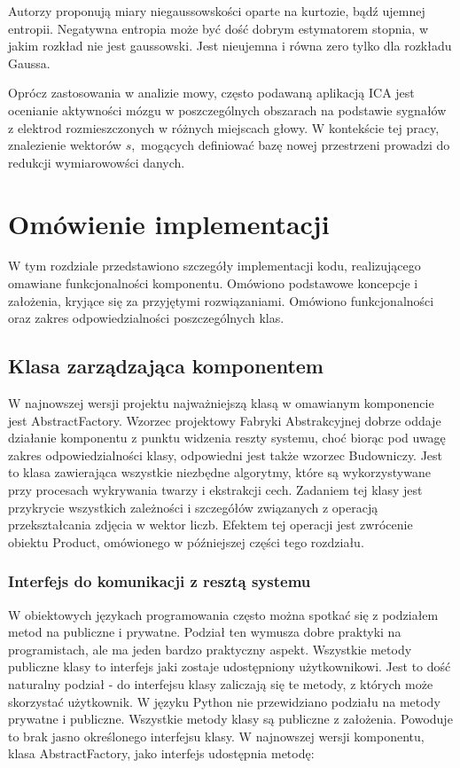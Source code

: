 \documentclass[oneside, eng]{mgr}
\begin{document}
Autorzy \cite{ICA} proponują miary niegaussowskości oparte na kurtozie, bądź ujemnej entropii. Negatywna entropia może być dość dobrym estymatorem stopnia, w jakim rozkład nie jest gaussowski. Jest nieujemna i równa zero tylko dla rozkładu Gaussa.


Oprócz zastosowania w analizie mowy, często podawaną aplikacją ICA jest ocenianie aktywności mózgu w poszczególnych obszarach na podstawie sygnałów z elektrod rozmieszczonych w różnych miejscach głowy. W kontekście tej pracy, znalezienie wektorów $s$,~mogących definiować bazę nowej przestrzeni prowadzi do redukcji wymiarowowści danych.

\newpage


\chapter{Omówienie implementacji}

W tym rozdziale przedstawiono szczegóły implementacji kodu, realizującego omawiane funkcjonalności komponentu. Omówiono podstawowe koncepcje i założenia, kryjące się za przyjętymi rozwiązaniami. Omówiono funkcjonalności oraz zakres odpowiedzialności poszczególnych klas.

\section{Klasa zarządzająca komponentem}

W najnowszej wersji projektu najważniejszą klasą w omawianym komponencie jest AbstractFactory. Wzorzec projektowy Fabryki Abstrakcyjnej dobrze oddaje działanie komponentu z punktu widzenia reszty systemu, choć biorąc pod uwagę zakres odpowiedzialności klasy, odpowiedni jest także wzorzec Budowniczy. Jest to klasa zawierająca wszystkie niezbędne algorytmy, które są wykorzystywane przy procesach wykrywania twarzy i ekstrakcji cech. Zadaniem tej klasy jest przykrycie wszystkich zależności i szczegółów związanych z operacją przekształcania zdjęcia w wektor liczb. Efektem tej operacji jest zwrócenie obiektu Product, omówionego w późniejszej części tego rozdziału.

\subsection{Interfejs do komunikacji z resztą systemu}

W obiektowych językach programowania często można spotkać się z podziałem metod na publiczne i prywatne. Podział ten wymusza dobre praktyki na programistach, ale ma jeden bardzo praktyczny aspekt. Wszystkie metody publiczne klasy to interfejs jaki zostaje udostępniony użytkownikowi. Jest to dość naturalny podział - do interfejsu klasy zaliczają się te metody, z których może skorzystać użytkownik. W języku Python nie przewidziano podziału na metody prywatne i publiczne. Wszystkie metody klasy są publiczne z założenia. Powoduje to brak jasno określonego interfejsu klasy. W najnowszej wersji komponentu, klasa AbstractFactory, jako interfejs udostępnia metodę:
\end{document}

